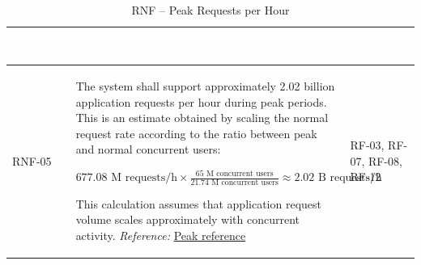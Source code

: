 \documentclass{article}
\begin{document}
\begin{table}[H]

\centering

\small

\renewcommand{\arraystretch}{1.35}

\caption{RNF -- Peak Requests per Hour}

\label{tab:rnf_peak_requests}

\begin{tabularx}{\textwidth}{|p{2.2cm}|X|p{3.5cm}|}

\hline

\rowcolor[HTML]{1F2937}

\textcolor{white}{\textbf{Identifier}} &
\textcolor{white}{\textbf{Description}} &
\textcolor{white}{\textbf{RF associated}} \\ \hline

RNF-05 &
The system shall support approximately 2.02 billion application requests per hour during peak periods. This is an estimate obtained by scaling the normal request rate according to the ratio between peak and normal concurrent users:

\(\displaystyle
677.08\text{ M requests/h}
\times
\frac{65\text{ M concurrent users}}
{21.74\text{ M concurrent users}}
\approx
2.02\text{ B requests/h}
\)

This calculation assumes that application request volume scales approximately with concurrent activity.
\textit{Reference:} \href{https://about.netflix.com/en/news/jake-paul-vs-mike-tyson-over-108-million-live-global-viewers}{Peak reference}
&
RF-03, RF-07, RF-08, RF-12 \\ \hline

\end{tabularx}

\end{table}


\end{document}
